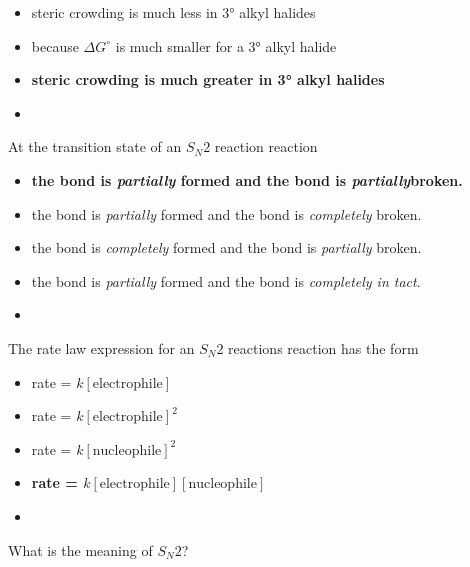 \documentclass[12pt,a4paper]{article}
\begin{document}
\begin{enumerate}
{\begin{itemize}
        \item steric crowding is much less in \ang{3} alkyl halides
        \item because \(\Delta G^\circ\) is much smaller for a \ang{3} alkyl halide
        \item {\color{o-Sun}\textbf{steric crowding is much greater in \ang{3} alkyl halides}}
    \end{itemize}
    }
    \begin{itemize}
        \item 
    \end{itemize}
    {\color{G-Moon}\item At the transition state of an \(S_N2\) reaction reaction
    \begin{itemize}
        \item {\color{o-Sun}\textbf{the  bond is \textit{partially} formed and the  bond is \textit{partially}broken.}}
        \item the  bond is \textit{partially} formed and the  bond is \textit{completely} broken.
        \item the  bond is \textit{completely} formed and the  bond is \textit{partially} broken.
        \item the  bond is \textit{partially} formed and the  bond is \textit{completely in tact}.
    \end{itemize}
    }
    \begin{itemize}
        \item 
    \end{itemize}
    {\color{G-Moon}\item The rate law expression for an \(S_N2\) reactions reaction has the form
    \begin{itemize}
        \item rate = \(k[\text{electrophile}]\)
        \item rate = \(k[\text{electrophile}]^2\)
        \item rate = \(k[\text{nucleophile}]^2\)
        \item {\color{o-Sun}\textbf{rate = \(k[\text{electrophile}][\text{nucleophile}]\)}}
    \end{itemize}
    }
    \begin{itemize}
        \item 
    \end{itemize}
    {\color{G-Moon}\item What is the meaning of \(S_N2\)?
}
\end{enumerate}
\end{document}
